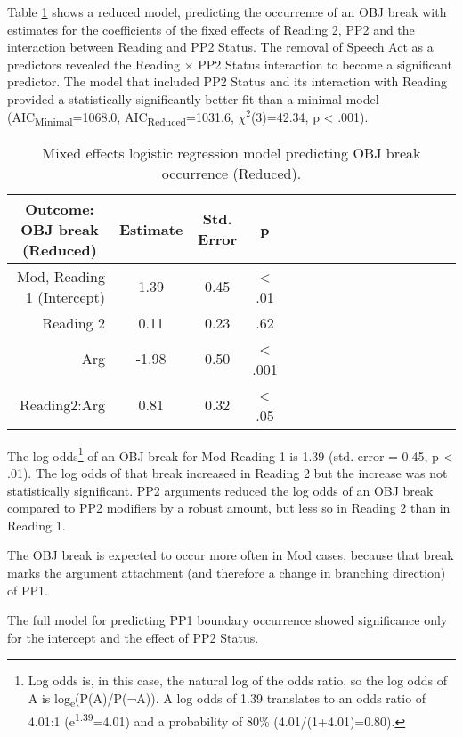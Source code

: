 \documentclass[11pt,oneside]{book}
\let\rmarkdownfootnote\footnote%
\def\footnote{\protect\rmarkdownfootnote}
\begin{document}
Table \ref{tab:objMod} shows a reduced model, predicting the occurrence of an OBJ break with estimates for the coefficients of the fixed effects of Reading 2, PP2 and the interaction between Reading and PP2 Status. The removal of Speech Act as a predictors revealed the Reading \(\times\) PP2 Status interaction to become a significant predictor. The model that included PP2 Status and its interaction with Reading provided a statistically significantly better fit than a minimal model (AIC\textsubscript{Minimal}=1068.0, AIC\textsubscript{Reduced}=1031.6, \(\chi^2\)(3)=42.34, p \textless{} .001).

\begin{table}[!h]

\caption{\label{tab:objMod}Mixed effects logistic regression model predicting OBJ break occurrence (Reduced).}
\centering
\begin{tabular}{rcccrcccrcccrccc}
\toprule
\multicolumn{1}{c}{Outcome: OBJ break (Reduced)} & \multicolumn{1}{c}{Estimate} & \multicolumn{1}{c}{Std. Error} & \multicolumn{1}{c}{p}\\
\midrule
Mod, Reading 1 (Intercept) & 1.39 & 0.45 & < .01\\
Reading 2 & 0.11 & 0.23 & .62\\
Arg & -1.98 & 0.50 & < .001\\
Reading2:Arg & 0.81 & 0.32 & < .05\\
\bottomrule
\end{tabular}
\end{table}

The log odds\footnote{Log odds is, in this case, the natural log of the odds ratio, so the log odds of A is log\textsubscript{e}(P(A)/P(¬A)). A log odds of 1.39 translates to an odds ratio of 4.01:1 (e\textsuperscript{1.39}=4.01) and a probability of 80\% (4.01/(1+4.01)=0.80).} of an OBJ break for Mod Reading 1 is 1.39 (std. error = 0.45, p \textless{} .01). The log odds of that break increased in Reading 2 but the increase was not statistically significant. PP2 arguments reduced the log odds of an OBJ break compared to PP2 modifiers by a robust amount, but less so in Reading 2 than in Reading 1.

The OBJ break is expected to occur more often in Mod cases, because that break marks the argument attachment (and therefore a change in branching direction) of PP1.

The full model for predicting PP1 boundary occurrence showed significance only for the intercept and the effect of PP2 Status.
\end{document}
